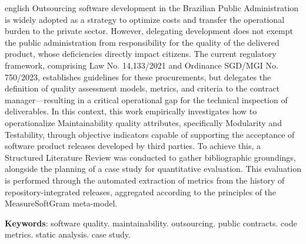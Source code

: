 \begin{resumo}[Abstract]
 \begin{otherlanguage*}{english}
Outsourcing software development in the Brazilian Public Administration is widely adopted as a strategy to optimize costs and transfer the operational burden to the private sector. However, delegating development does not exempt the public administration from responsibility for the quality of the delivered product, whose deficiencies directly impact citizens. The current regulatory framework, comprising Law No. 14,133/2021 and Ordinance SGD/MGI No. 750/2023, establishes guidelines for these procurements, but delegates the definition of quality assessment models, metrics, and criteria to the contract manager—resulting in a critical operational gap for the technical inspection of deliverables. In this context, this work empirically investigates how to operationalize Maintainability quality attributes, specifically Modularity and Testability, through objective indicators capable of supporting the acceptance of software product releases developed by third parties. To achieve this, a Structured Literature Review was conducted to gather bibliographic groundings, alongside the planning of a case study for quantitative evaluation. This evaluation is performed through the automated extraction of metrics from the history of repository-integrated releases, aggregated according to the principles of the MeasureSoftGram meta-model.

\vspace{\onelineskip}

\noindent
\textbf{Keywords}: software quality. maintainability. outsourcing. public contracts. code metrics. static analysis. case study.
 \end{otherlanguage*}
\end{resumo}
